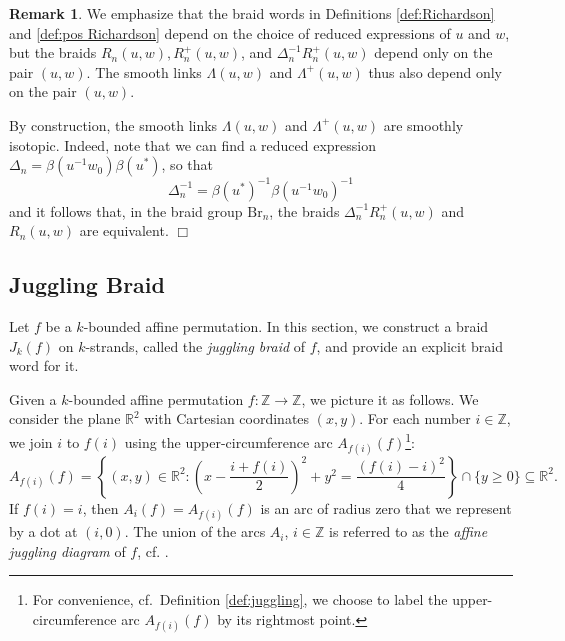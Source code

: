 \documentclass[10pt]{amsart}
\theoremstyle{plain}
\theoremstyle{definition}
\newtheorem{remark}[thm]{Remark}
\theoremstyle{remark}
\numberwithin{equation}{section}
\newcommand{\Z}{\mathbb{Z}}
\newcommand{\R}{\mathbb{R}}
\newcommand{\La}{\Lambda}
\newcommand{\sse}{\subseteq}
\newcommand{\lr}{\longrightarrow}
\newcommand{\Br}{\mathrm{Br}}
\begin{document}
\begin{remark}
We emphasize that the braid words in Definitions \ref{def:Richardson} and \ref{def:pos Richardson} depend on the choice of reduced expressions of $u$ and $w$, but the braids $R_n(u, w), R^{+}_{n}(u, w)$, and $\Delta^{-1}_{n}R^{+}_{n}(u, w)$ depend only on the pair $(u, w)$. The smooth links $\La(u,w)$ and $\La^{+}(u, w)$ thus also depend only on the pair $(u, w)$.

By construction, the smooth links $\La(u,w)$ and $\La^{+}(u, w)$ are smoothly isotopic. Indeed, note that we can find a reduced expression 
$\Delta_n = \beta(u^{-1}w_0)\beta(u^*)$, so that
$$
\Delta_n^{-1}=\beta(u^*)^{-1}\beta(u^{-1}w_0)^{-1}
$$
and it follows that, in the braid group $\Br_n$, the braids $\Delta_n^{-1}R^{+}_n(u,w)$ and $R_n(u,w)$ are equivalent. 
\hfill$\Box$
\end{remark}

\subsection{Juggling Braid}\label{ssec:JugglingBraid}
Let $f$ be a $k$-bounded affine permutation. In this section, we construct a braid $J_k(f)$ on $k$-strands, called the \emph{juggling braid} of $f$, and provide an explicit braid word for it.

Given a $k$-bounded affine permutation $f: \Z \lr \Z$, we picture it as follows. We consider the plane $\R^2$ with Cartesian coordinates $(x,y)$. For each number $i \in \Z$, we join $i$ to $f(i)$ using the upper-circumference arc $A_{f(i)}(f)$\footnote{For convenience, cf.~Definition \ref{def:juggling}, we choose to label the upper-circumference arc $A_{f(i)}(f)$ by its rightmost point.}:
\[A_{f(i)}(f)=\left\{(x,y)\in\R^2: \left(x - \frac{i+f(i)}{2}\right)^{2}+y^2=\frac{(f(i)-i)^2}{4}\right\}\cap\{y\geq0\}\sse\R^2.\]
If $f(i) = i$, then $A_{i}(f) = A_{f(i)}(f)$ is an arc of radius zero that we represent by a dot at $(i, 0)$. The union of the arcs $A_{i}$, $i \in \Z$ is referred to as the \emph{affine juggling diagram} of $f$, cf. \cite{KLS}.
\end{document}

